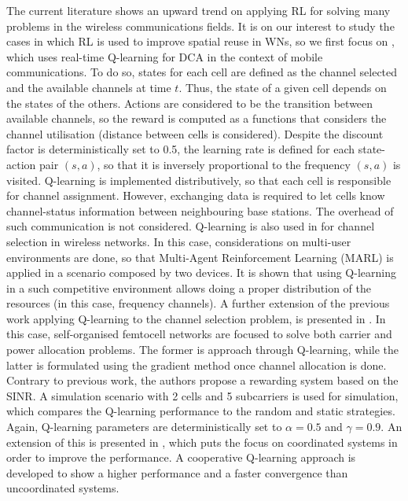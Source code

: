\documentclass[12pt, a4paper,twoside]{tesi_upf}
\begin{document}
				The current literature shows an upward trend on applying RL for solving many problems in the wireless communications fields. It is on our interest to study the cases in which RL is used to improve spatial reuse in WNs, so we first focus on \cite{nie1999q}, which uses real-time Q-learning for DCA in the context of mobile communications. To do so, states for each cell are defined as the channel selected and the available channels at time $t$. Thus, the state of a given cell depends on the states of the others. Actions are considered to be the transition between available channels, so the reward is computed as a functions that considers the channel utilisation (distance between cells is considered). Despite the discount factor is deterministically set to 0.5, the learning rate is defined for each state-action pair $(s,a)$, so that it is inversely proportional to the frequency $(s,a)$ is visited. Q-learning is implemented distributively, so that each cell is responsible for channel assignment. However, exchanging data is required to let cells know channel-status information between neighbouring base stations. The overhead of such communication is not considered. Q-learning is also used in \cite{li2009multi} for channel selection in wireless networks. In this case, considerations on multi-user environments are done, so that Multi-Agent Reinforcement Learning (MARL) is applied in a scenario composed by two devices. It is shown that using Q-learning in a such competitive environment allows doing a proper distribution of the resources (in this case, frequency channels). A further extension of the previous work applying Q-learning to the channel selection problem, is presented in \cite{bennis2010q}. In this case, self-organised femtocell networks are focused to solve both carrier and power allocation problems. The former is approach through Q-learning, while the latter is formulated using the gradient method once channel allocation is done. Contrary to previous work, the authors propose a rewarding system based on the SINR. A simulation scenario with 2 cells and 5 subcarriers is used for simulation, which compares the Q-learning performance to the random and static strategies. Again, Q-learning parameters are deterministically set to $\alpha = 0.5$ and $\gamma = 0.9$.	An extension of this is presented in \cite{bennis2011distributed}, which puts the focus on coordinated systems in order to improve the performance. A cooperative Q-learning approach is developed to show a higher performance and a faster convergence than uncoordinated systems.
					
\end{document}
